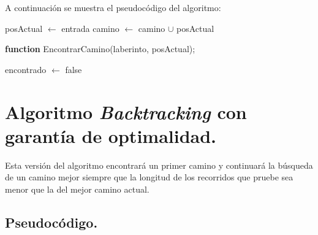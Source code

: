 \documentclass[11pt,a4paper]{article}
\begin{document}
			\par
			A continuación se muestra el pseudocódigo del algoritmo:

			\vspace{2mm}

			\begin{algorithm}[H]

				posActual $\longleftarrow$ entrada\;
				camino $\longleftarrow$ camino $\cup$ posActual\;

				\textbf{function} EncontrarCamino(laberinto, posActual);

				encontrado $\longleftarrow$ false\;
				

			\end{algorithm}

\newpage

	\section{Algoritmo \textit{Backtracking} con garantía de optimalidad.}

		\par
		Esta versión del algoritmo encontrará un primer camino y continuará la búsqueda de un camino mejor siempre que la longitud de los recorridos que pruebe sea menor que la del mejor camino actual.

		\subsection{Pseudocódigo.}
\end{document}
